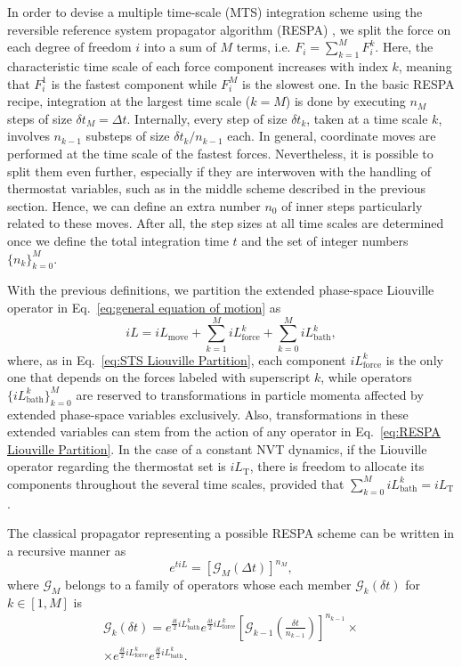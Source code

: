 \documentclass[
    journal=jctcce,
    layout=twocolumn
]{achemso}
\newcommand{\dof}{i}   %
\newcommand{\Liu}{i\!L}
\begin{document}
In order to devise a multiple time-scale (MTS) integration scheme using the reversible reference system propagator algorithm (RESPA) \cite{Tuckerman_1992}, we split the force on each degree of freedom $\dof$ into a sum of $M$ terms, i.e. $F_\dof = \sum_{k=1}^M F_\dof^k$.
Here, the characteristic time scale of each force component increases with index $k$, meaning that $F_\dof^1$ is the fastest component while $F_\dof^M$ is the slowest one.
In the basic RESPA recipe, integration at the largest time scale ($k=M$) is done by executing $n_M$ steps of size $\delta t_M = \Delta t$.
Internally, every step of size $\delta t_k$, taken at a time scale $k$, involves $n_{k-1}$ substeps of size $\delta t_k/n_{k-1}$ each.
In general, coordinate moves are performed at the time scale of the fastest forces.
Nevertheless, it is possible to split them even further, especially if they are interwoven with the handling of thermostat variables, such as in the middle scheme described in the previous section.
Hence, we can define an extra number $n_0$ of inner steps particularly related to these moves.
After all, the step sizes at all time scales are determined once we define the total integration time $t$ and the set of integer numbers $\{n_k\}_{k=0}^M$.

With the previous definitions, we partition the extended phase-space Liouville operator in Eq.~\eqref{eq:general equation of motion} as
\begin{equation}
\label{eq:RESPA Liouville Partition}
\Liu = \Liu_\mathrm{move} + \sum_{k=1}^M \Liu_\mathrm{force}^k + \sum_{k=0}^M \Liu_\mathrm{bath}^k,
\end{equation}
where, as in Eq.~\eqref{eq:STS Liouville Partition}, each component $\Liu_\mathrm{force}^k$ is the only one that depends on the forces labeled with superscript $k$, while operators $\{\Liu_\mathrm{bath}^k\}_{k=0}^M$ are reserved to transformations in particle momenta affected by extended phase-space variables exclusively.
Also, transformations in these extended variables can stem from the action of any operator in Eq.~\eqref{eq:RESPA Liouville Partition}.
In the case of a constant NVT dynamics, if the Liouville operator regarding the thermostat set is $\Liu_\mathrm{T}$, there is freedom to allocate its components throughout the several time scales, provided that $\sum_{k=0}^M \Liu_\mathrm{bath}^k = \Liu_\mathrm{T}$.

The classical propagator representing a possible RESPA scheme can be written in a recursive manner as
\begin{equation}
\label{eq:RESPA outermost propagator}
e^{t \Liu} = [\mathcal{G}_M(\Delta t)]^{n_M},
\end{equation}
where $\mathcal{G}_M$ belongs to a family of operators whose each member $\mathcal{G}_k(\delta t)$ for $k \in [1, M]$ is
\begin{multline}
\label{eq:RESPA scheme 1}
\mathcal{G}_k(\delta t) = e^{\frac{\delta t}{2} \Liu_\mathrm{bath}^k}
e^{\frac{\delta t}{2} \Liu_\mathrm{force}^k}
\left[ \mathcal{G}_{k-1}\left(\tfrac{\delta t}{n_{k-1}}\right) \right]^{n_{k-1}} \times \\
\times e^{\frac{\delta t}{2} \Liu_\mathrm{force}^k}
e^{\frac{\delta t}{2} \Liu_\mathrm{bath}^k}.
\end{multline}
\end{document}
